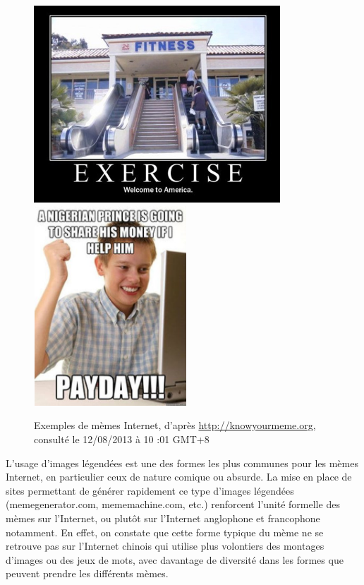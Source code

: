 \begin{figure}[h]
    \centering
    \includegraphics[width=3.6335in,height=2.9114in]{figures/chap2/chapitre2-img3.jpg}
    \includegraphics[width=2.2559in,height=2.9449in]{figures/chap2/chapitre2-img4.jpg}
    \caption[Exemples de mèmes internet]{Exemples de mèmes Internet, d{\textquoteright}après \url{http://knowyourmeme.org}, consulté le 12/08/2013 à 10 :01 GMT+8}
    \label{fig:memes-examples}
\end{figure}


L{\textquoteright}usage d{\textquoteright}images légendées est une des formes les plus communes pour les mèmes Internet, en particulier ceux de nature comique ou absurde. La mise en place de sites permettant de générer rapidement ce type d{\textquoteright}images légendées (memegenerator.com, mememachine.com, etc.) renforcent l{\textquoteright}unité formelle des mèmes sur l{\textquoteright}Internet, ou plutôt sur l{\textquoteright}Internet anglophone et francophone notamment. En effet, on constate que cette forme typique du mème ne se retrouve pas sur l{\textquoteright}Internet chinois qui utilise plus volontiers des montages d{\textquoteright}images ou des jeux de mots, avec davantage de diversité dans les formes que peuvent prendre les différents mèmes.

